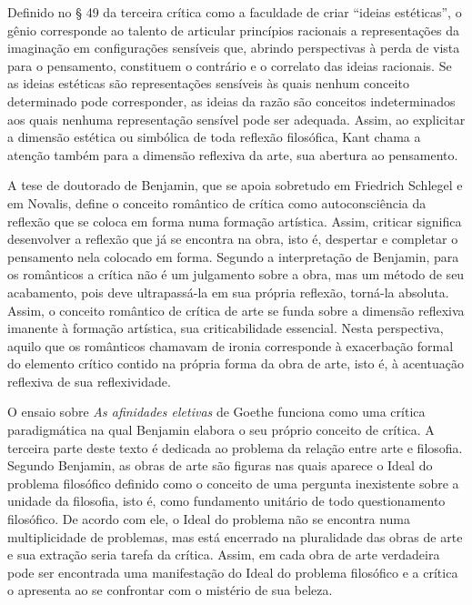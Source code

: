 Definido no § 49 da terceira crítica como a faculdade de criar ``ideias
estéticas'', o gênio corresponde ao talento de articular princípios
racionais a representações da imaginação em configurações sensíveis que,
abrindo perspectivas à perda de vista para o pensamento, constituem o
contrário e o correlato das ideias racionais. Se as ideias estéticas são
representações sensíveis às quais nenhum conceito determinado pode
corresponder, as ideias da razão são conceitos indeterminados aos quais
nenhuma representação sensível pode ser adequada. Assim, ao explicitar a
dimensão estética ou simbólica de toda reflexão filosófica, Kant chama a
atenção também para a dimensão reflexiva da arte, sua abertura ao
pensamento.

A tese de doutorado de Benjamin, que se apoia sobretudo em Friedrich
Schlegel e em Novalis, define o conceito romântico de crítica como
autoconsciência da reflexão que se coloca em forma numa formação
artística. Assim, criticar significa desenvolver a reflexão que já se
encontra na obra, isto é, despertar e completar o pensamento nela
colocado em forma. Segundo a interpretação de Benjamin, para os
românticos a crítica não é um julgamento sobre a obra, mas um método de
seu acabamento, pois deve ultrapassá-la em sua própria reflexão, torná-la
absoluta. Assim, o conceito romântico de crítica de arte se funda sobre
a dimensão reflexiva imanente à formação artística, sua criticabilidade
essencial. Nesta perspectiva, aquilo que os românticos chamavam de
ironia corresponde à exacerbação formal do elemento crítico contido na
própria forma da obra de arte, isto é, à acentuação reflexiva de sua
reflexividade.

O ensaio sobre \emph{As afinidades eletivas} de Goethe funciona como uma
crítica paradigmática na qual Benjamin elabora o seu próprio conceito de
crítica. A terceira parte deste texto é dedicada ao problema da relação
entre arte e filosofia. Segundo Benjamin, as obras de arte são figuras
nas quais aparece o Ideal do problema filosófico definido como o
conceito de uma pergunta inexistente sobre a unidade da filosofia, isto
é, como fundamento unitário de todo questionamento filosófico. De acordo
com ele, o Ideal do problema não se encontra numa multiplicidade de
problemas, mas está encerrado na pluralidade das obras de arte e sua
extração seria tarefa da crítica. Assim, em cada obra de arte verdadeira
pode ser encontrada uma manifestação do Ideal do problema filosófico e a
crítica o apresenta ao se confrontar com o mistério de sua beleza.

